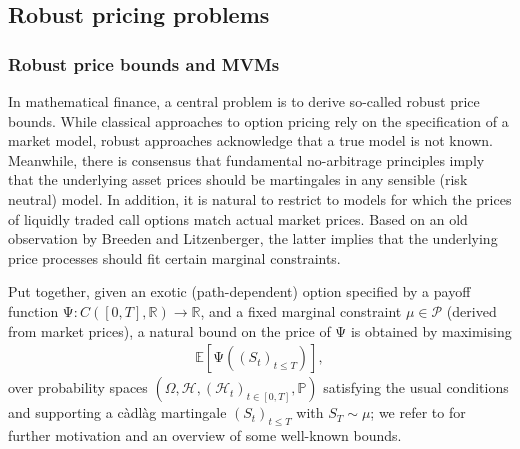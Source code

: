 \documentclass{article}
\theoremstyle{definition}
\numberwithin{equation}{section}
\numberwithin{theorem}{section}
\newcommand{\E}{\mathbb{E}}
\renewcommand{\P}{\mathbb{P}}
\newcommand{\R}{\mathbb{R}}
\newcommand{\Hc}{\mathcal{H}}
\newcommand{\Pc}{\mathcal{P}}
\newcommand{\cadlag}{c\`adl\`ag}
\renewcommand{\P}{{\mathbb P}}
\begin{document}
	
	




	
	
	
	\subsection{Robust pricing problems}
	
	
	\subsubsection*{Robust price bounds and MVMs}
	
	In mathematical finance, a central problem is to derive so-called robust price bounds. While classical approaches to option pricing rely on the specification of a market model, robust approaches acknowledge that a true model is not known. Meanwhile, there is consensus that fundamental no-arbitrage principles imply that the underlying asset prices should be martingales in any sensible (risk neutral) model. In addition, it is natural to restrict to models for which the prices of liquidly traded call options match actual market prices. Based on an old observation by Breeden and Litzenberger, the latter implies that the underlying price processes should fit certain marginal constraints. 
	
	Put together, given an exotic (path-dependent) option specified by a payoff function $\mathrm{\Psi}: C([0,T],\R)\to\R$, and a fixed marginal constraint $\mu\in\Pc$  (derived from market prices), a natural bound on the price of $\mathrm{\Psi}$ is obtained by maximising 
		\begin{align}\label{eq:robust_problem}
			\E\left[\mathrm{\Psi}\left((S_t)_{t\le T}\right)\right],
		\end{align}
	over probability spaces $(\Omega,\Hc,(\Hc_t)_{t\in[0,T]},\P)$ satisfying the usual conditions and supporting a \cadlag{} martingale $(S_t)_{t\le T}$ with $S_T\sim\mu$; we refer to \cite{hobson2003} for further motivation and an overview of some well-known bounds. 
	
\end{document}
